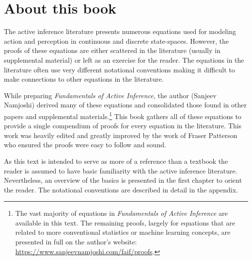 \chapter*{About this book}

The active inference literature presents numerous equations used for modeling action and perception in continuous and discrete state-spaces. However, the proofs of these equations are either scattered in the literature (usually in supplemental material) or left as an exercise for the reader. The equations in the literature often use very different notational conventions making it difficult to make connections to other equations in the literature.

While preparing \textit{Fundamentals of Active Inference}, the author (Sanjeev Namjoshi) derived many of these equations and consolidated those found in other papers and supplemental materials.\footnote{The vast majority of equations in \textit{Fundamentals of Active Inference} are available in this text. The remaining proofs, largely for equations that are related to more conventional statistics or machine learning concepts, are presented in full on the author's website: \url{https://www.sanjeevnamjoshi.com/faif/proofs}.} This book gathers all of these equations to provide a single compendium of proofs for every equation in the literature. This work was heavily edited and greatly improved by the work of Fraser Patterson who ensured the proofs were easy to follow and sound.

As this text is intended to serve as more of a reference than a textbook the reader is assumed to have basic familiarity with the active inference literature. Nevertheless, an overview of the basics is presented in the first chapter to orient the reader. The notational conventions are described in detail in the appendix.
